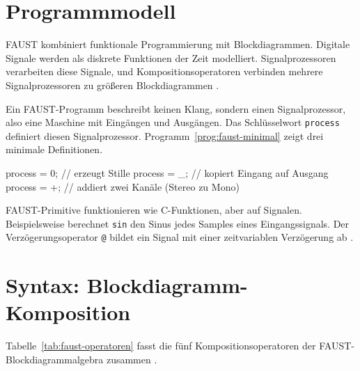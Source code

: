 \section{Programmmodell}

FAUST kombiniert funktionale Programmierung mit Blockdiagrammen. Digitale Signale werden als diskrete Funktionen der Zeit modelliert. Signalprozessoren verarbeiten diese Signale, und Kompositionsoperatoren verbinden mehrere Signalprozessoren zu größeren Blockdiagrammen \parencite[S.~3--4]{orlarey:hal-02159014}.
	
Ein FAUST-Programm beschreibt keinen Klang, sondern einen Signalprozessor, also eine Maschine mit Eingängen und Ausgängen. Das Schlüsselwort \texttt{process} definiert diesen Signalprozessor. Programm~\ref{prog:faust-minimal} zeigt drei minimale Definitionen.




\begin{program}
	\caption{Minimale FAUST-Signalprozessoren}
	\label{prog:faust-minimal}
	\begin{GenericCode}
		process = 0;         // erzeugt Stille
		process = _;         // kopiert Eingang auf Ausgang
		process = +;         // addiert zwei Kanäle (Stereo zu Mono)
	\end{GenericCode}
\end{program}



FAUST-Primitive funktionieren wie C-Funktionen, aber auf Signalen. Beispielsweise berechnet \texttt{sin} den Sinus jedes Samples eines Eingangssignals. Der Verzögerungsoperator \texttt{@} bildet ein Signal mit einer zeitvariablen Verzögerung ab \parencite{orlarey:hal-02159014}.

\section{Syntax: Blockdiagramm-Komposition}

Tabelle~\ref{tab:faust-operatoren} fasst die fünf Kompositionsoperatoren der FAUST-Blockdiagrammalgebra zusammen \parencite[S.~5]{orlarey:hal-02159014}.

